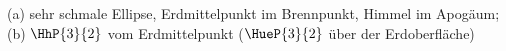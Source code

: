 (a) sehr schmale Ellipse, Erdmittelpunkt im Brennpunkt, Himmel im Apogäum; (b) $\HhP{3}{2}$ vom Erdmittelpunkt ($\HueP{3}{2}$ über der Erdoberfläche)
